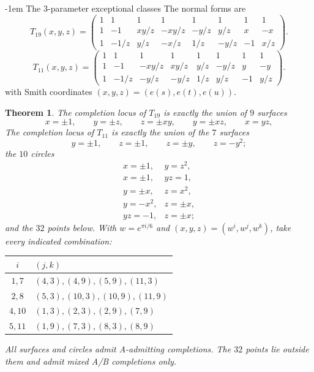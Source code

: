 \documentclass[11pt,a4paper]{article}
\makeatletter
\newtheorem{theorem}{Theorem}[section]
\theoremstyle{plain}
\theoremstyle{definition}
\numberwithin{equation}{section}
\renewcommand\subsection{\@startsection{subsection}{2}{\z@}  {\medskipamount}  {-1em}  {\normalfont\normalsize\bfseries}}
\makeatother
\begin{document}
\subsection{The 3-parameter exceptional classes}\label{sec:class19}\label{sec:class11}
The normal forms are
$$
T_{19}(x,y,z)=
\begin{pmatrix}
1&1&1&1&1&1&1&1\\
1&-1&xy/z&-xy/z&-y/z&y/z&x&-x\\
1&-1/z&y/z&-x/z&1/z&-y/z&-1&x/z
\end{pmatrix}.
$$
$$
T_{11}(x,y,z)=
\begin{pmatrix}
1&1&1&1&1&1&1&1\\
1&-1&-xy/z&xy/z&y/z&-y/z&y&-y\\
1&-1/z&-y/z&-y/z&1/z&y/z&-1&y/z
\end{pmatrix}.
$$
with Smith coordinates $(x,y,z)=(e(s),e(t),e(u))$.
\begin{theorem}\label{thm:19}\label{thm:11}
The completion locus of $T_{19}$ is exactly the union of $9$ surfaces
$$
\boxed{x=\pm1,\qquad y=\pm z,\qquad z=\pm xy,
\qquad y=\pm xz,\qquad x=yz,}
$$
The completion locus of $T_{11}$ is exactly the union of the $7$ surfaces
$$y=\pm1,\qquad z=\pm1,\qquad z=\pm y,\qquad z=-y^2;$$
the $10$ circles
$$
\begin{array}{ll}
x=\pm1,&y=z^2,\\
x=\pm1,&yz=1,\\
y=\pm x,&z=x^2,\\
y=-x^2,&z=\pm x,\\
yz=-1,&z=\pm x;
\end{array}
$$
and the $32$ points below. With $w=e^{\pi i/6}$ and $(x,y,z)=(w^i,w^j,w^k)$, take every indicated combination:
\begin{center}\begin{tabular}{cl}\toprule
$i$&$(j,k)$\\\midrule
$1,7$&$(4,3),(4,9),(5,9),(11,3)$\\
$2,8$&$(5,3),(10,3),(10,9),(11,9)$\\
$4,10$&$(1,3),(2,3),(2,9),(7,9)$\\
$5,11$&$(1,9),(7,3),(8,3),(8,9)$\\\bottomrule
\end{tabular}\end{center}
All surfaces and circles admit A-admitting completions. The $32$ points lie outside them and admit mixed A/B completions only.
\end{theorem}
\end{document}

